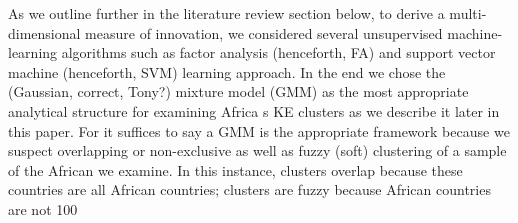\documentclass[11pt]{article}
\begin{document}
As we outline further in the literature review section below, to derive a multi-dimensional measure of innovation, we considered several unsupervised machine-learning algorithms such as factor analysis (henceforth, FA) and support vector machine (henceforth, SVM) learning approach. In the end we chose the (Gaussian, correct, Tony?) mixture model (GMM) as the most appropriate analytical structure for examining Africa \textquotesingle s KE clusters as we describe it later in this paper. For it suffices to say a GMM is the appropriate framework because we suspect overlapping or non-exclusive as well as fuzzy (soft) clustering of a sample of the African we examine. In this instance, clusters overlap because these countries are all African countries; clusters are fuzzy because African countries are not 100%
\end{document}

